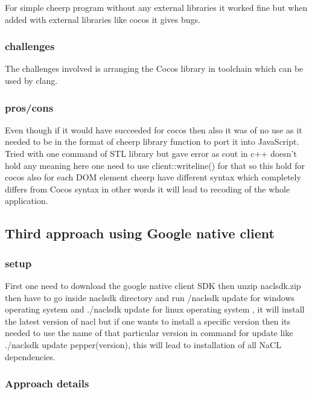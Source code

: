 \documentclass[23pt]{article}
\begin{document}
{\Large For simple cheerp program without any external libraries it worked fine but when added with external libraries like cocos it gives bugs. \par}

\subsubsection{challenges}

{\Large The challenges involved is arranging the Cocos library in toolchain which can be used by clang.}

\subsubsection{pros/cons}

{\Large Even though if it would have succeeded for cocos then also it was of no use as it needed to be in the format of cheerp library function to port it into JavaScript. Tried with one command of STL library but gave error as cout in c++ doesn’t hold any meaning here one need to use client::writeline() for that so this hold for cocos also for each DOM element cheerp have different syntax which completely differs from Cocos syntax in other words it will lead to recoding of the whole application. \par}

\subsection{Third approach using Google native client}

\subsubsection{setup}

{\Large First one need to download the google native client SDK then unzip nacl\textunderscore sdk.zip then have to go inside nacl\textunderscore sdk directory and run /naclsdk update for windows operating system and ./naclsdk update for linux operating system , it will install the latest version 
of nacl but if one wants to install a specific version then its needed to use the name of that particular version in command for update like ./naclsdk update pepper\textunderscore (version), this will lead to installation of all NaCL dependencies.\par}

\subsubsection{Approach details}
\end{document}
